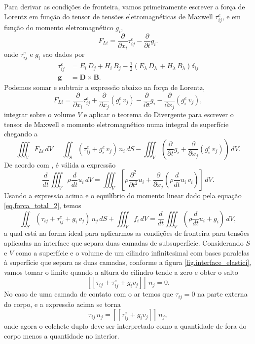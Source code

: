 Para derivar as condi\c{c}\~oes de fronteira, vamos primeiramente escrever a for\c{c}a de Lorentz em fun\c{c}\~ao do tensor de tens\~oes eletromagn\'eticas de Maxwell $\tau_{ij}^e$, e em fun\c{c}\~ao do momento eletromagn\'etico $g_i$,
\begin{equation}
F_{Li}=\frac{\partial}{\partial x_i}\tau_{ij}^e-\frac{\partial}{\partial t}g_i.
\end{equation}
onde $\tau_{ij}^e$ e $g_i$ sao dados por
\begin{align*}
\tau_{ij}^e&=E_i\,D_j+H_i\,B_j-\frac{1}{2}(E_\lambda\,D_\lambda\,+H_\lambda\,B_\lambda)\delta_{ij}\\
\mathbf{g}&=\mathbf{D}\times\mathbf{B}.
\end{align*}
Podemos somar e subtrair a express\~ao abaixo na for\c{c}a de Lorentz,
\begin{equation}
F_{Li}=\frac{\partial}{\partial x_i}\tau_{ij}^e+\frac{\partial}{\partial x_j}(g_i^e\,v_j)-\frac{\partial}{\partial t}g_i-\frac{\partial}{\partial x_j}(g_i^e\,v_j),
\end{equation}
integrar sobre o volume $V$ e aplicar o teorema do Divergente para escrever o tensor de Maxwell e momento eletromagn\'etico numa integral de superf\'icie chegando a 
\begin{equation}
\iiint_VF_{Li}\,dV=\iint_S(\tau_{ij}^e+g_i^e\,v_j)\,n_i\,dS-\iiint_V\left(\frac{\partial}{\partial t}g_i+\frac{\partial}{\partial x_j}(g_i^e\,v_j)\right)\,dV.
\end{equation}
De acordo com \cite{Eringen_1962}, \'e v\'alida a express\~ao
\begin{equation}
\frac{d}{dt}\iiint_V\rho\frac{d}{dt}u_i\,dV=\iiint_V\left[\rho\frac{\partial^2}{\partial t^2}u_i+\frac{\partial}{\partial x_j}\left(\rho\frac{d}{dt}u_i\,v_i\right)\right]\,dV.
\end{equation}
Usando a express\~ao acima e o equil\'ibrio do momento linear dado pela equa\c{c}\~ao \ref{eq.forca_total_2}, temos
\begin{equation}
\iint_S\left(\tau_{ij}+\tau_{ij}^e+g_i\,v_j\right)\,n_j\,dS+\iiint_Vf_i\,dV=\frac{d}{dt}\iiint_V\left(\rho\frac{d}{dt}u_i+g_i\right)\,dV,
\end{equation}
a qual est\'a na forma ideal para aplicarmos as condi\c{c}\~oes de fronteira para tens\~oes aplicadas na interface que separa duas camadas de subsuperf\'icie. Considerando $S$ e $V$ como a superf\'icie e o volume de um cilindro infinitesimal  com bases paralelas \`a superf\'icie que separa as duas camadas, conforme a figura \ref{fig.interface_elastici}, vamos tomar o limite quando a altura do cilindro tende a zero e obter o salto
\begin{equation}
\left[\left[\tau_{ij}+\tau^e_{ij}+g_iv_j\right]\right]\,n_j=0.
\end{equation}
No caso de uma camada de contato com o ar temos que $\tau_{ij}=0$ na parte externa do corpo, e a express\~ao acima se torna 
\begin{equation}
\tau_{ij}\,n_j=\left[\left[\tau^e_{ij}+g_iv_j\right]\right]\,n_j,
\end{equation} 
onde agora o colchete duplo deve ser interpretado como a quantidade de fora do corpo menos a quantidade no interior.

